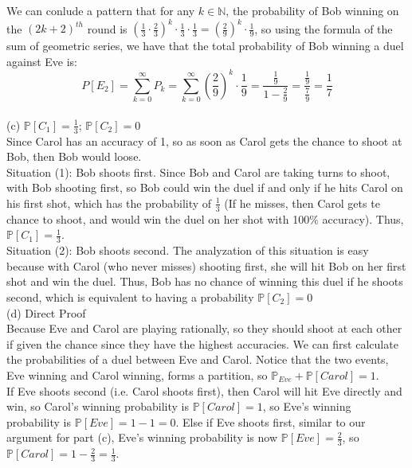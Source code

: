 \documentclass{article}
\begin{document}
We can conlude a pattern that for any $k\in\mathbb{N}$, the probability of Bob winning on the $(2k+2)^{th}$ round is $(\frac{1}{3}\cdot\frac{2}{3})^k \cdot \frac{1}{3}\cdot \frac{1}{3} = 
(\frac{2}{9})^k\cdot \frac{1}{9}$, so using the formula of the sum of geometric series, we have that the total probability of Bob winning a duel against Eve is:
$$P[E_2] = \sum\limits_{k=0}^\infty P_k = 
\sum\limits_{k=0}^\infty (\frac{2}{9})^k\cdot \frac{1}{9} = 
\frac{\frac{1}{9}}{1-\frac{2}{9}} = \frac{\frac{1}{9}}{\frac{7}{9}} = \frac{1}{7}$$ \\[.5cm]
{\color{red} (c) $\mathbb{P}[C_1] = \frac{1}{3}$; $\mathbb{P}[C_2] = 0$} \\

Since Carol has an accuracy of 1, so as soon as Carol gets the chance to shoot at Bob, then Bob would loose. \\

Situation (1): Bob shoots first. Since Bob and Carol are taking turns to shoot, with Bob shooting first, so Bob could win the duel if and only if he hits Carol on his first shot, which has the probability of $\frac{1}{3}$ (If he misses, then Carol gets te chance to shoot, and would win the duel on her shot with 100\% accuracy). Thus, $\mathbb{P}[C_1] = \frac{1}{3}$. \\

Situation (2): Bob shoots second. The analyzation of this situation is easy because with Carol (who never misses) shooting first, she will hit Bob on her first shot and win the duel. Thus, Bob has no chance of winning this duel if he shoots second, which is equivalent to having a probability $\mathbb{P}[C_2] = 0$ \\[.5cm]
{\color{red} (d) Direct Proof} \\

Because Eve and Carol are playing rationally, so they should shoot at each other if given the chance since they have the highest accuracies. We can first calculate the probabilities of a duel between Eve and Carol. Notice that the two events, Eve winning and Carol winning, forms a partition, so $\mathbb{P}_{Eve} + \mathbb{P}[Carol] = 1$. \\

If Eve shoots second (i.e. Carol shoots first), then Carol will hit Eve directly and win, so Carol's winning probability is $\mathbb{P}[Carol] = 1$, so Eve's winning probability is $\mathbb{P}[Eve] = 1 - 1 = 0$. Else if Eve shoots first, similar to our argument for part (c), Eve's winning probability is now $\mathbb{P}[Eve] = \frac{2}{3}$, so $\mathbb{P}[Carol] = 1 - \frac{2}{3} = \frac{1}{3}$. \\
\end{document}
